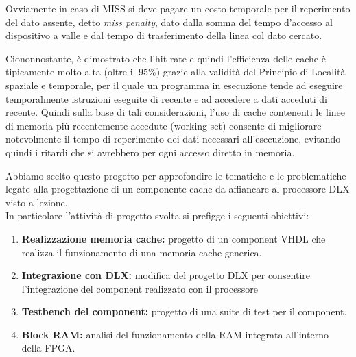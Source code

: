 Ovviamente in caso di MISS si deve pagare un costo temporale per il reperimento del dato assente, detto \emph{miss penalty}, dato dalla somma del tempo d'accesso al dispositivo a valle e dal tempo di trasferimento della linea col dato cercato.

Ciononnostante, \`e dimostrato che l'hit rate e quindi l'efficienza delle cache \`e tipicamente molto alta (oltre il 95\%) grazie alla validit\`a del Principio di Localit\`a spaziale e temporale, per il quale un programma in esecuzione tende ad eseguire temporalmente istruzioni eseguite di recente e ad accedere a dati acceduti di recente.
Quindi sulla base di tali considerazioni, l'uso di cache contenenti le linee di memoria pi\`u recentemente accedute (working set) consente di migliorare notevolmente il tempo di reperimento dei dati necessari all'esecuzione, evitando quindi i ritardi che si avrebbero per ogni accesso diretto in memoria.

Abbiamo scelto questo progetto per approfondire le tematiche e le problematiche legate alla progettazione di un componente cache da affiancare al processore DLX visto a lezione.\\

In particolare l'attivit\`a di progetto svolta si prefigge i seguenti obiettivi:

\begin{enumerate}

\item \textbf{Realizzazione memoria cache:} progetto di un component VHDL che realizza il funzionamento di una memoria cache generica.

\item \textbf{Integrazione con DLX:} modifica del progetto DLX per consentire l'integrazione del component realizzato con il processore

\item \textbf{Testbench del component:} progetto di una suite di test per il component.

\item \textbf{Block RAM:} analisi del funzionamento della RAM integrata all'interno della FPGA.

\end{enumerate}